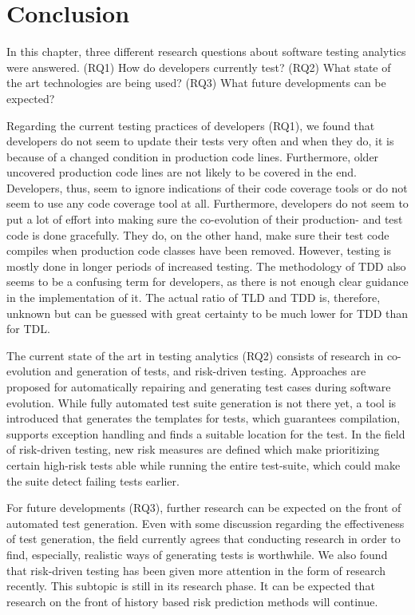 \documentclass[]{book}
\begin{document}
\section{Conclusion}\label{conclusion}

In this chapter, three different research questions about software
testing analytics were answered. (RQ1) How do developers currently test?
(RQ2) What state of the art technologies are being used? (RQ3) What
future developments can be expected?

Regarding the current testing practices of developers (RQ1), we found
that developers do not seem to update their tests very often and when
they do, it is because of a changed condition in production code lines.
Furthermore, older uncovered production code lines are not likely to be
covered in the end. Developers, thus, seem to ignore indications of
their code coverage tools or do not seem to use any code coverage tool
at all. Furthermore, developers do not seem to put a lot of effort into
making sure the co-evolution of their production- and test code is done
gracefully. They do, on the other hand, make sure their test code
compiles when production code classes have been removed. However,
testing is mostly done in longer periods of increased testing. The
methodology of TDD also seems to be a confusing term for developers, as
there is not enough clear guidance in the implementation of it. The
actual ratio of TLD and TDD is, therefore, unknown but can be guessed
with great certainty to be much lower for TDD than for TDL.

The current state of the art in testing analytics (RQ2) consists of
research in co-evolution and generation of tests, and risk-driven
testing. Approaches are proposed for automatically repairing and
generating test cases during software evolution. While fully automated
test suite generation is not there yet, a tool is introduced that
generates the templates for tests, which guarantees compilation,
supports exception handling and finds a suitable location for the test.
In the field of risk-driven testing, new risk measures are defined which
make prioritizing certain high-risk tests able while running the entire
test-suite, which could make the suite detect failing tests earlier.

For future developments (RQ3), further research can be expected on the
front of automated test generation. Even with some discussion regarding
the effectiveness of test generation, the field currently agrees that
conducting research in order to find, especially, realistic ways of
generating tests is worthwhile. We also found that risk-driven testing
has been given more attention in the form of research recently. This
subtopic is still in its research phase. It can be expected that
research on the front of history based risk prediction methods will
continue.
\end{document}
